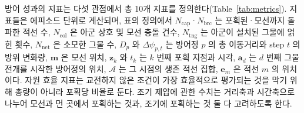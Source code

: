 방어 성과의 지표는 다섯 관점에서 총 10개 지표를 정의한다(Table~\ref{tab:metrics}). 지표들은 에피소드
단위로 계산되며, 표의 정의에서 $N_\mathrm{cap}$·$N_\mathrm{brc}$ 는 포획된·모선까지 돌파한 적선
수, $N_\mathrm{col}$ 은 아군 상호 및 모선 충돌 건수, $N_\mathrm{tng}$ 는 아군이 설치된
그물에 얽힌 횟수, $N_\mathrm{net}$ 은 소모한 그물 수, $D_p$ 와 $\Delta\psi_{p,t}$ 는
방어정 $p$ 의 총 이동거리와 step $t$ 의 방위 변화량, $\mathbf{m}$ 은 모선 위치,
$\mathbf{z}_k$ 와 $t_k$ 는 $k$ 번째 포획 지점과 시각, $\mathbf{a}_d$ 는 $d$ 번째 그물
전개를 시작한 방어정의 위치, $\mathcal{A}$ 는 그 시점의 생존 적선 집합, $\mathbf{e}_m$ 은 적선 $m$ 의 위치이다.
자원 효율 지표는 교전하지 않은 조건이 가장 효율적으로 평가되는 것을 막기 위해 총량이
아니라 포획당 비율로 둔다. 조기 제압에 관한 수치는 거리축과 시간축으로 나누어 모선과 먼 곳에서 포획하는 것과, 조기에 포획하는 것 둘 다 고려하도록 한다.

